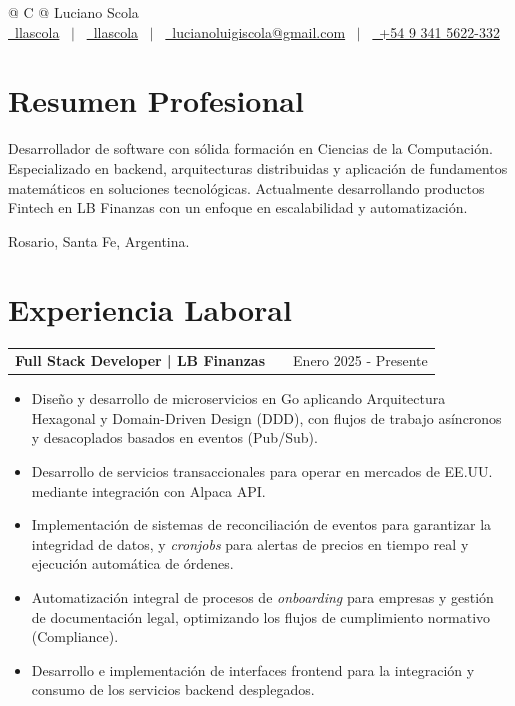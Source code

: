 \documentclass[a4paper,12pt]{article}
\makeatletter
\newenvironment{joblong}[2]
    {
    \begin{tabularx}{\linewidth}{@{}l X r@{}}
    \textbf{#1} & \hfill & #2 \\[3.75pt]
    \end{tabularx}
    \begin{itemize}[nosep, after=\strut, leftmargin=1em, itemsep=3pt, label=--]
    }
    {
    \end{itemize}
    }
\makeatother
\begin{document}
\pagestyle{empty}

\begin{tabularx}{\linewidth}{@{} C @{}}
{\Huge Luciano Scola} \\[7.5pt]
\href{https://github.com/llascola}{\raisebox{-0.05\height}{\faGithub}\ llascola} \ $|$ \
\href{https://linkedin.com/in/llascola}{\raisebox{-0.05\height}{\faLinkedin}\ llascola} \ $|$ \
\href{mailto:lucianoluigiscola@gmail.com}{\raisebox{-0.05\height}{\faEnvelope}\ lucianoluigiscola@gmail.com} \ $|$ \
\href{tel:+5493415622332}{\raisebox{-0.05\height}{\faMobile}\ +54 9 341 5622-332} \\
\end{tabularx}

\section{Resumen Profesional}
Desarrollador de software con sólida formación en Ciencias de la Computación. Especializado en backend, arquitecturas distribuidas y aplicación de fundamentos matemáticos en soluciones tecnológicas. Actualmente desarrollando productos Fintech en LB Finanzas con un enfoque en escalabilidad y automatización.

Rosario, Santa Fe, Argentina.

\section{Experiencia Laboral}

\begin{joblong}{Full Stack Developer | LB Finanzas}{Enero 2025 - Presente}
\item Diseño y desarrollo de microservicios en Go aplicando Arquitectura Hexagonal y Domain-Driven Design (DDD), con flujos de trabajo asíncronos y desacoplados basados en eventos (Pub/Sub).
\item Desarrollo de servicios transaccionales para operar en mercados de EE.UU. mediante integración con Alpaca API.
\item Implementación de sistemas de reconciliación de eventos para garantizar la integridad de datos, y \textit{cronjobs} para alertas de precios en tiempo real y ejecución automática de órdenes.
\item Automatización integral de procesos de \textit{onboarding} para empresas y gestión de documentación legal, optimizando los flujos de cumplimiento normativo (Compliance).
\item Desarrollo e implementación de interfaces frontend para la integración y consumo de los servicios backend desplegados.
\end{joblong}
\end{document}
